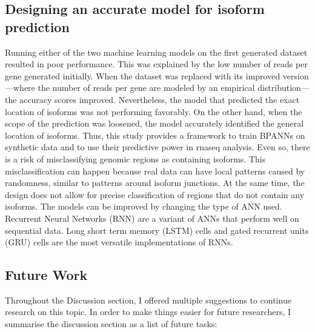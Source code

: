\documentclass[12pt]{article}
\begin{document}
\subsection{Designing an accurate model for isoform prediction}
Running either of the two machine learning models on the first generated dataset resulted in poor performance. This was explained by the low number of reads per gene generated initially. When the dataset was replaced with its improved version---where the number of reads per gene are modeled by an empirical distribution---the accuracy scores improved. Nevertheless, the model that predicted the exact location of isoforms was not performing favorably. On the other hand, when the scope of the prediction was loosened, the model accurately identified the general location of isoforms. Thus, this study provides a framework to train BPANNs on synthetic data and to use their predictive power in \acrshort{rnaseq} analysis. Even so, there is a risk of misclassifying genomic regions as containing isoforms. This misclassification can happen because real data can have local patterns caused by randomness, similar to patterns around isoform junctions. At the same time, the design does not allow for precise classification of regions that do not contain any isoforms. The models can be improved by changing the type of ANN used. Recurrent Neural Networks (RNN) are a variant of ANNs that perform well on sequential data. Long short term memory (LSTM) cells and gated recurrent units (GRU) cells are the most versatile implementations of RNNs.   

\subsection{Future Work}
Throughout the Discussion section, I offered multiple suggestions to continue research on this topic. In order to make things easier for future researchers, I summarise the discussion section as a list of future tasks:
\end{document}
